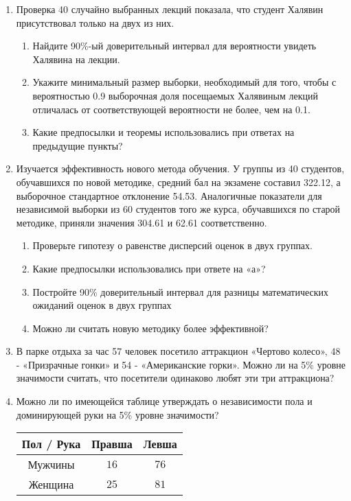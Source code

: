 \begin{enumerate}
\item Проверка 40 случайно выбранных лекций показала, что студент
Халявин присутствовал только на двух из них.
\begin{enumerate}
\item Найдите 90\%-ый доверительный интервал для вероятности
увидеть Халявина на лекции.
\item Укажите минимальный размер выборки, необходимый для того,
чтобы с вероятностью 0.9 выборочная доля посещаемых Халявиным
лекций отличалась от соответствующей вероятности не более, чем на 0.1.
\item Какие предпосылки и теоремы использовались при ответах на предыдущие пункты?
\end{enumerate}

\item Изучается эффективность нового метода обучения. У группы из 40
студентов, обучавшихся по новой методике, средний бал на экзамене
составил 322.12, а выборочное стандартное отклонение 54.53.
Аналогичные показатели для независимой выборки из 60 студентов
того же курса, обучавшихся по старой методике,
приняли значения 304.61 и 62.61 соответственно.
\begin{enumerate}
\item Проверьте гипотезу о равенстве дисперсий оценок в двух
группах.
\item Какие предпосылки использовались при ответе на «а»?
\item Постройте 90\% доверительный интервал для разницы
математических ожиданий оценок в двух группах
\item Можно ли считать новую методику более эффективной?
\end{enumerate}

\item В парке отдыха за час 57 человек посетило аттракцион «Чертово
колесо», 48 - «Призрачные гонки» и 54 - «Американские горки». Можно ли на 5\% уровне значимости считать, что посетители
одинаково любят эти три аттракциона?

\item Можно ли по имеющейся таблице утверждать о независимости пола и
доминирующей руки на 5\% уровне значимости?

\begin{tabular}{@{}ccc@{}}
\toprule
Пол / Рука & Правша & Левша \\ \midrule
Мужчины    & $16$     & $76$    \\
Женщина    & $25$     & $81$ \\ \bottomrule
\end{tabular}


\end{enumerate}
